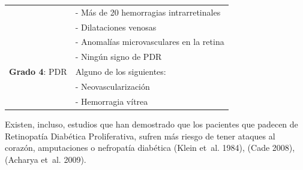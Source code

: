 \documentclass[
  12pt,
  spanish,
  a4paperpaper,
]{report}
\begin{document}
\begin{longtable}[]{@{}ll@{}}
\begin{minipage}[t]{0.37\columnwidth}
\end{minipage} & \begin{minipage}[t]{0.57\columnwidth}\raggedright
- Más de 20 hemorragias intrarretinales\strut
\end{minipage}\tabularnewline
\begin{minipage}[t]{0.37\columnwidth}\raggedright
\strut
\end{minipage} & \begin{minipage}[t]{0.57\columnwidth}\raggedright
- Dilataciones venosas\strut
\end{minipage}\tabularnewline
\begin{minipage}[t]{0.37\columnwidth}\raggedright
\strut
\end{minipage} & \begin{minipage}[t]{0.57\columnwidth}\raggedright
- Anomalías microvasculares en la retina\strut
\end{minipage}\tabularnewline
\begin{minipage}[t]{0.37\columnwidth}\raggedright
\strut
\end{minipage} & \begin{minipage}[t]{0.57\columnwidth}\raggedright
- Ningún signo de PDR\strut
\end{minipage}\tabularnewline
\begin{minipage}[t]{0.37\columnwidth}\raggedright
\textbf{Grado 4}: PDR\strut
\end{minipage} & \begin{minipage}[t]{0.57\columnwidth}\raggedright
Alguno de los siguientes:\strut
\end{minipage}\tabularnewline
\begin{minipage}[t]{0.37\columnwidth}\raggedright
\strut
\end{minipage} & \begin{minipage}[t]{0.57\columnwidth}\raggedright
- Neovascularización\strut
\end{minipage}\tabularnewline
\begin{minipage}[t]{0.37\columnwidth}\raggedright
\strut
\end{minipage} & \begin{minipage}[t]{0.57\columnwidth}\raggedright
- Hemorragia vítrea\strut
\end{minipage}\tabularnewline
\bottomrule
\end{longtable}

Existen, incluso, estudios que han demostrado que los pacientes que
padecen de Retinopatía Diabética Proliferativa, sufren más riesgo de
tener ataques al corazón, amputaciones o nefropatía diabética (Klein
et~al. 1984), (Cade 2008), (Acharya et~al. 2009).
\end{document}
